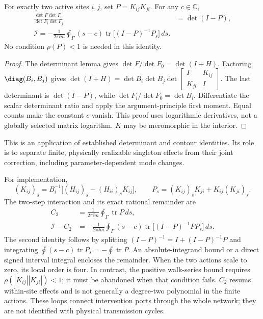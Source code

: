 \begin{proposition}
For exactly two active sites $i,j$, set $P=K_{ij}K_{ji}$. For any $c\in\mathbb C$,
\begin{align}
 \frac{\det F\det F_0}{\det F_i\det F_j}
 &=\det(I-P),\label{eq:pair-determinant}\\
 \boxed{\mathcal I=-\frac{1}{2\pi\ii m}\oint_\Gamma(s-c)
 \operatorname{tr}\big[(I-P)^{-1}P_s\big]\,ds.}\label{eq:pair-rational}
\end{align}
No condition $\rho(P)<1$ is needed in this identity.
\end{proposition}
\begin{proof}
The determinant lemma gives $\det F/\det F_0=\det(I+H)$.
Factoring $\diag(B_i,B_j)$ gives
$\det(I+H)=\det B_i\det B_j\det\left[\begin{smallmatrix}I&K_{ij}\\K_{ji}&I\end{smallmatrix}\right]$.
The last determinant is $\det(I-P)$, while
$\det F_i/\det F_0=\det B_i$. Differentiate the scalar determinant ratio
and apply the argument-principle first moment. Equal counts make the
constant $c$ vanish. This proof uses logarithmic derivatives, not a
globally selected matrix logarithm. $K$ may be meromorphic in the interior.
\end{proof}
This is an application of established determinant and contour identities.
Its role is to separate finite, physically realizable singleton effects
from their joint correction, including parameter-dependent mode changes.

For implementation,
\begin{equation}
 (K_{ij})_s=B_i^{-1}\big[(H_{ij})_s-(H_{ii})_sK_{ij}\big],\qquad
 P_s=(K_{ij})_sK_{ji}+K_{ij}(K_{ji})_s.
\end{equation}
The two-step interaction and its exact rational remainder are
\begin{align}
 C_2&=\frac{1}{2\pi\ii m}\oint_\Gamma\operatorname{tr}P\,ds,\\
 \mathcal I-C_2&=-\frac{1}{2\pi\ii m}\oint_\Gamma(s-c)
 \operatorname{tr}\big[(I-P)^{-1}P P_s\big]\,ds.\label{eq:rational-remainder}
\end{align}
The second identity follows by splitting $(I-P)^{-1}=I+(I-P)^{-1}P$
and integrating $\oint(s-c)\operatorname{tr}P_s=-\oint\operatorname{tr}P$.
An absolute-integrand bound or a direct signed interval integral encloses
the remainder. When the two actions scale to zero, its local order is
four. In contrast, the positive walk-series bound requires
$\rho(|K_{ij}||K_{ji}|)<1$; it must be abandoned when that condition fails.
$C_2$ resums within-site effects and is not generally a degree-two polynomial
in the finite actions. These loops connect intervention ports through the
whole network; they are not identified with physical transmission cycles.

